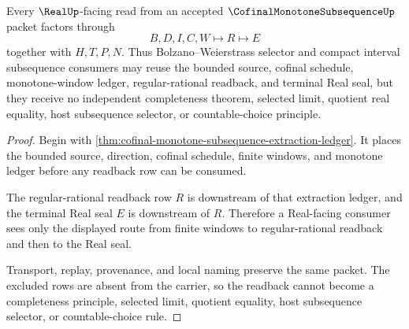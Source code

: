 \begin{theorem}
\label{thm:cofinal-monotone-subsequence-real-readback}
Every $\RealUp$-facing read from an accepted $\CofinalMonotoneSubsequenceUp$ packet factors through
$$
B,D,I,C,W \longmapsto R \longmapsto E
$$
together with $H,T,P,N$. Thus Bolzano--Weierstrass selector and compact interval subsequence consumers may reuse the bounded source, cofinal schedule, monotone-window ledger, regular-rational readback, and terminal Real seal, but they receive no independent completeness theorem, selected limit, quotient real equality, host subsequence selector, or countable-choice principle.
\end{theorem}
\begin{proof}
Begin with \autoref{thm:cofinal-monotone-subsequence-extraction-ledger}. It places the bounded source, direction, cofinal schedule, finite windows, and monotone ledger before any readback row can be consumed.

The regular-rational readback row $R$ is downstream of that extraction ledger, and the terminal Real seal $E$ is downstream of $R$. Therefore a Real-facing consumer sees only the displayed route from finite windows to regular-rational readback and then to the Real seal.

Transport, replay, provenance, and local naming preserve the same packet. The excluded rows are absent from the carrier, so the readback cannot become a completeness principle, selected limit, quotient equality, host subsequence selector, or countable-choice rule.
\end{proof}




